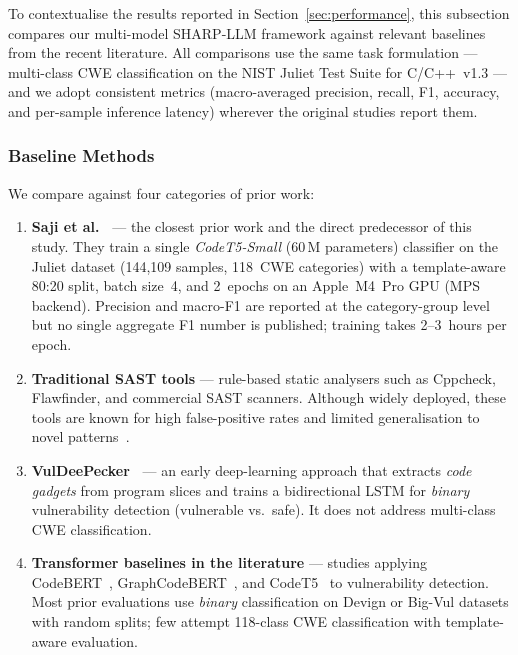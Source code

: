 To contextualise the results reported in
Section~\ref{sec:performance}, this subsection compares our
multi-model SHARP-LLM framework against relevant baselines from the
recent literature.  All comparisons use the same task formulation ---
multi-class CWE classification on the NIST Juliet Test Suite for
C/C++~v1.3 --- and we adopt consistent metrics (macro-averaged
precision, recall, F1, accuracy, and per-sample inference latency)
wherever the original studies report them.

\subsubsection{Baseline Methods}
We compare against four categories of prior work:

\begin{enumerate}
    \item \textbf{Saji et al.~\cite{saji2025efficient}} --- the closest
          prior work and the direct predecessor of this study.
          They train a single \emph{CodeT5-Small} (60\,M parameters)
          classifier on the Juliet dataset (144,109 samples, 118~CWE
          categories) with a template-aware 80:20 split, batch size~4,
          and 2~epochs on an Apple~M4~Pro GPU (MPS backend).
          Precision and macro-F1 are reported at the category-group level
          but no single aggregate F1 number is published; training takes
          2--3~hours per epoch.
    \item \textbf{Traditional SAST tools} --- rule-based static analysers
          such as Cppcheck, Flawfinder, and commercial SAST scanners.
          Although widely deployed, these tools are known for high
          false-positive rates and limited generalisation to novel
          patterns~\cite{johnson2013why}.
    \item \textbf{VulDeePecker~\cite{li2018vuldeepecker}} --- an early
          deep-learning approach that extracts \emph{code gadgets} from
          program slices and trains a bidirectional LSTM for
          \emph{binary} vulnerability detection (vulnerable vs.\ safe).
          It does not address multi-class CWE classification.
    \item \textbf{Transformer baselines in the literature} --- studies
          applying CodeBERT~\cite{feng2020codebert},
          GraphCodeBERT~\cite{guo2020graphcodebert}, and
          CodeT5~\cite{wang2021codet5} to vulnerability detection.
          Most prior evaluations use \emph{binary} classification on
          Devign or Big-Vul datasets with random splits; few attempt
          118-class CWE classification with template-aware evaluation.
\end{enumerate}

